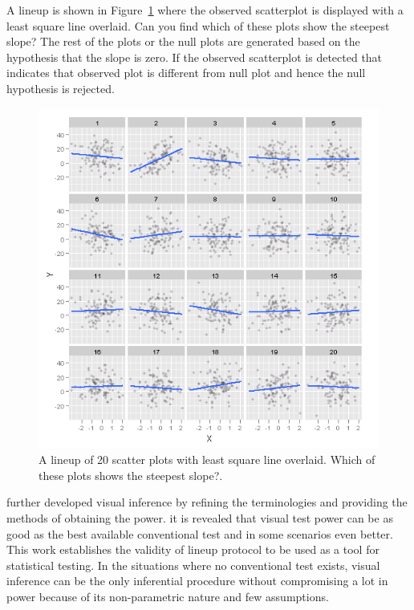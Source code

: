 \documentclass[11pt]{article}
\begin{document}
A lineup is shown in Figure~\ref{fig:lineup_turk} where the observed scatterplot is displayed with a least square line overlaid. Can you find which of these plots show the steepest slope? The rest of the plots or the null plots are generated based on the hypothesis that the slope is zero. If the observed scatterplot is detected that indicates that observed plot is different from null plot and hence the null hypothesis is rejected.

\begin{figure}[htbp] 
   \centering
   \includegraphics[width=6.5in]{plot_turk2_100_450_12_3.png} 
   \caption{A lineup of 20 scatter plots with least square line overlaid. Which of these plots shows the steepest slope?.}
   \label{fig:lineup_turk}
\end{figure}


\cite{majumder:2013}  further developed visual inference by refining the terminologies and providing the methods of obtaining the power. it is revealed that visual test power can be as good as the best available conventional test and in some scenarios even better. This work establishes the validity of lineup protocol to be used as a tool for statistical testing. In the situations where no conventional test exists, visual inference can be the only inferential procedure without compromising a lot in power because of its non-parametric nature and few assumptions. 
\end{document}
